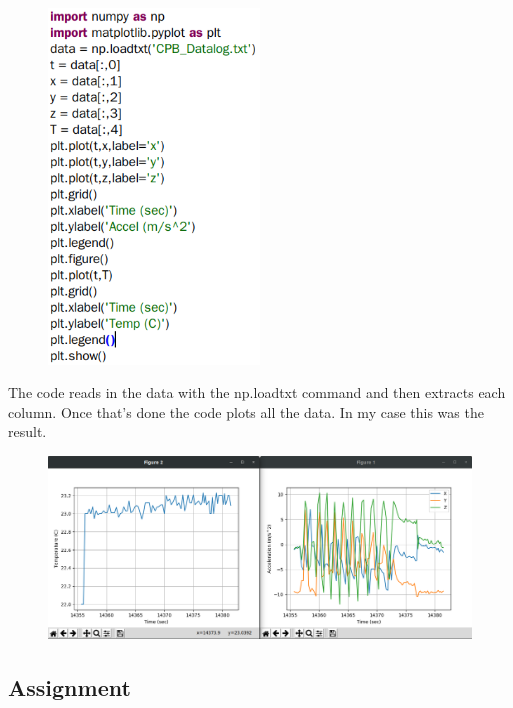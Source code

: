 \begin{figure}[H]
  \begin{center}
    \includegraphics[width=0.5\textwidth]{Figures/phoneapp_plotcode.png}
  \end{center}
\end{figure}
The code reads in the data with the np.loadtxt command and then
extracts each column. Once that's done the code plots all the data. In
my case this was the result. 
\begin{figure}[H]
  \begin{center}
    \includegraphics[width=\textwidth]{Figures/phoneapp_plots.png}
  \end{center}
\end{figure}

\subsection{Assignment}

